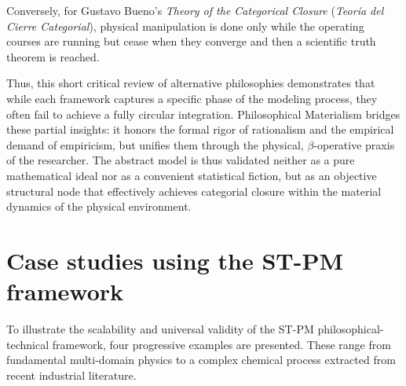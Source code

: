 \documentclass[11pt, a4paper]{article}
\begin{document}
Conversely, for Gustavo Bueno's \textit{Theory of the Categorical Closure} (\textit{Teoría del Cierre Categorial}), physical manipulation is done only while the operating courses are running but cease when they converge and then a scientific truth {theorem} is reached.

Thus, this short critical review of alternative philosophies demonstrates that while each framework captures a specific phase of the modeling process, they often fail to achieve a fully circular integration. Philosophical Materialism bridges these partial insights: it honors the formal rigor of rationalism and the empirical demand of empiricism, but unifies them through the physical, $\beta$-operative praxis of the researcher. The abstract model is thus validated neither as a pure mathematical ideal nor as a convenient statistical fiction, but as an objective structural node that effectively achieves categorial closure within the material dynamics of the physical environment.



\section{Case studies using the ST-PM framework}
To illustrate the scalability and universal validity of the ST-PM philosophical-technical framework, four progressive examples are presented. These range from fundamental multi-domain physics to a complex chemical process extracted from recent industrial literature.
\end{document}
